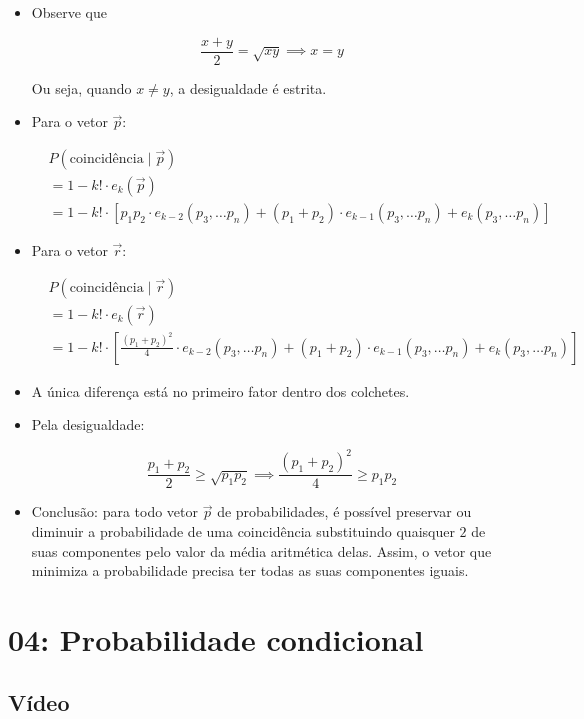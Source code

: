 \documentclass[
  11pt]{report}
\begin{document}
\begin{itemize}
\item
  Observe que

  \[
  \frac{x + y}{2} = \sqrt{xy} \implies x = y
  \]

  Ou seja, quando $x \neq y$, a desigualdade é estrita.
\item
  Para o vetor $\vec p$:

  \[
  \begin{aligned}
  &
  P( \text{coincidência} \mid \vec p) \\
  &=
  1 - k! \cdot e_k(\vec p) \\
  &=
  1 - k! \cdot \left[ 
  p_1p_2 \cdot e_{k-2}(p_3, \ldots p_n) +
  (p_1 + p_2) \cdot e_{k-1}(p_3, \ldots p_n) +
  e_{k}(p_3, \ldots p_n)
  \right]
  \end{aligned}
  \]
\item
  Para o vetor $\vec r$:

  \[
  \begin{aligned}
  &
  P( \text{coincidência} \mid \vec r) \\
  &=
  1 - k! \cdot e_k(\vec r) \\
  &=
  1 - k! \cdot \left[ 
  \frac{(p_1 + p_2)^2}{4} \cdot e_{k-2}(p_3, \ldots p_n) +
  (p_1 + p_2) \cdot e_{k-1}(p_3, \ldots p_n) +
  e_{k}(p_3, \ldots p_n)
  \right]
  \end{aligned}
  \]
\item
  A única diferença está no primeiro fator dentro dos colchetes.
\item
  Pela desigualdade:

  \[
  \frac{p_1 + p_2}{2} \geq \sqrt{p_1p_2} \implies 
  \frac{(p_1 + p_2)^2}{4} \geq p_1p_2
  \]
\item
  Conclusão: para todo vetor $\vec p$ de probabilidades, é possível preservar ou diminuir a probabilidade de uma coincidência substituindo quaisquer $2$ de suas componentes pelo valor da média aritmética delas. Assim, o vetor que minimiza a probabilidade precisa ter todas as suas componentes iguais.
\end{itemize}

\hypertarget{probabilidade-condicional}{%
\chapter*{04: Probabilidade condicional}\label{probabilidade-condicional}}

\hypertarget{vuxeddeo-3}{%
\section*{Vídeo}\label{vuxeddeo-3}}
\end{document}

